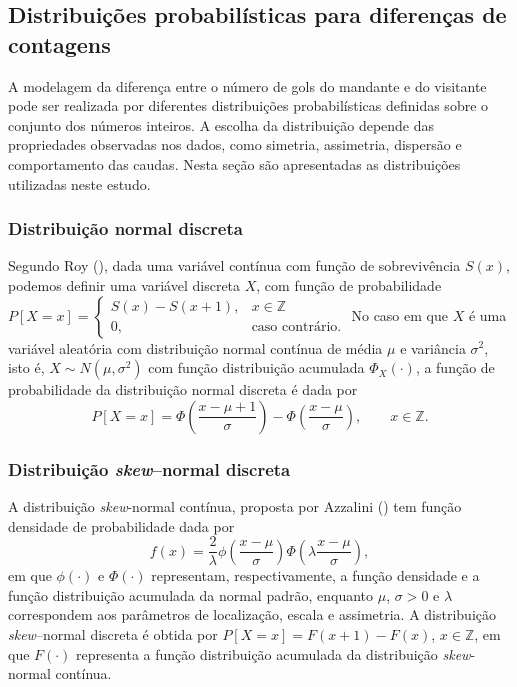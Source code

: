 \documentclass[12pt,a4paper]{article}\usepackage[]{graphicx}\usepackage[]{xcolor}
\begin{document}

\subsection{Distribuições probabilísticas para diferenças de contagens}

A modelagem da diferença entre o número de gols do mandante e do visitante pode ser realizada por diferentes distribuições probabilísticas definidas sobre o conjunto dos números inteiros. A escolha da distribuição depende das propriedades observadas nos dados, como simetria, assimetria, dispersão e comportamento das caudas. Nesta seção são apresentadas as distribuições utilizadas neste estudo.

\subsubsection{Distribuição normal discreta}\label{sec:norm}
Segundo Roy (\citeyear{Roy2003}), dada uma variável contínua com função de sobrevivência $S(x)$, podemos definir uma variável discreta $X$, com função de probabilidade 
$P[X=x]=\begin{cases}
S(x)-S(x+1),&x\in\mathbb{Z}\\
0,&\text{caso contrário.}
\end{cases}$ No caso em que \(X\) é uma variável aleatória com distribuição normal contínua de média \(\mu\) e variância \(\sigma^2\), isto é, $X\sim N(\mu,\sigma^2)$ com função distribuição acumulada $\Phi_X(\cdot)$, a função de probabilidade da distribuição normal discreta é dada por
\[
P[X=x]=
\Phi\left(\frac{x-\mu+1}{\sigma}\right)
-
\Phi\left(\frac{x-\mu}{\sigma}\right),
\qquad
x\in\mathbb{Z}.
\]
\subsubsection{Distribuição \textit{skew}--normal discreta}\label{sec:snorm}
A distribuição \textit{skew}-normal contínua, proposta por Azzalini (\citeyear{azzalini1985}) tem função densidade de probabilidade dada por
\[
f(x)=
\frac{2}{\lambda}
\phi\left(\frac{x-\mu}{\sigma}\right)
\Phi\left(
\lambda\frac{x-\mu}{\sigma}
\right),
\]
em que \(\phi(\cdot)\) e \(\Phi(\cdot)\) representam, respectivamente, a função densidade e a função distribuição acumulada da normal padrão, enquanto \(\mu\), \(\sigma>0\) e \(\lambda\) correspondem aos parâmetros de localização, escala e assimetria. A distribuição \textit{skew}--normal discreta é obtida por
$P[X=x]=F(x+1)-F(x)$, $x\in\mathbb{Z}$, em que \(F(\cdot)\) representa a função distribuição acumulada da distribuição \textit{skew}-normal contínua.
\end{document}
